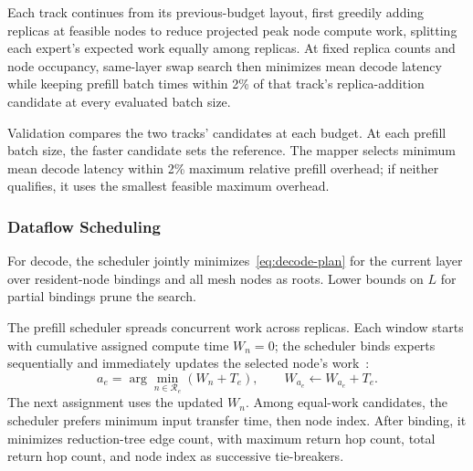 Each track continues from its previous-budget layout, first greedily adding replicas at feasible nodes to reduce projected peak node compute work, splitting each expert's expected work equally among replicas. At fixed replica counts and node occupancy, same-layer swap search then minimizes mean decode latency while keeping prefill batch times within 2\% of that track's replica-addition candidate at every evaluated batch size.

Validation compares the two tracks' candidates at each budget. At each prefill batch size, the faster candidate sets the reference. The mapper selects minimum mean decode latency within 2\% maximum relative prefill overhead; if neither qualifies, it uses the smallest feasible maximum overhead.

\subsubsection{Dataflow Scheduling}
For decode, the scheduler jointly minimizes~\eqref{eq:decode-plan} for the current layer over resident-node bindings and all mesh nodes as roots. Lower bounds on $L$ for partial bindings prune the search.

The prefill scheduler spreads concurrent work across replicas. Each window starts with cumulative assigned compute time $W_n=0$; the scheduler binds experts sequentially and immediately updates the selected node's work~\cite{hdmoe2025}:
\begin{equation}
  a_e=\arg\min_{n\in\mathcal{R}_e}(W_n+T_e),\qquad
  W_{a_e}\leftarrow W_{a_e}+T_e.
  \label{eq:prefill-bind}
\end{equation}
The next assignment uses the updated $W_n$. Among equal-work candidates, the scheduler prefers minimum input transfer time, then node index. After binding, it minimizes reduction-tree edge count, with maximum return hop count, total return hop count, and node index as successive tie-breakers.

